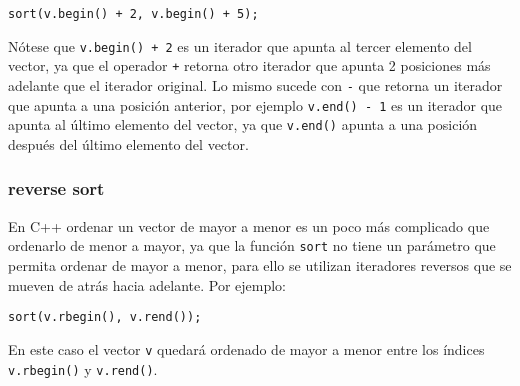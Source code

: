 \begin{lstlisting}
sort(v.begin() + 2, v.begin() + 5);
\end{lstlisting}

Nótese que \texttt{v.begin() + 2} es un iterador que apunta al tercer elemento del vector, ya que el operador \texttt{+}
retorna otro iterador que apunta 2 posiciones más adelante que el iterador original. Lo mismo sucede con \texttt{-} que
retorna un iterador que apunta a una posición anterior, por ejemplo \texttt{v.end() - 1} es un iterador que apunta al
último elemento del vector, ya que \texttt{v.end()} apunta a una posición después del último elemento del vector.


\subsubsection{reverse sort}

En C++ ordenar un vector de mayor a menor es un poco más complicado que ordenarlo de menor a mayor, ya que la función
\texttt{sort} no tiene un parámetro que permita ordenar de mayor a menor, para ello se utilizan iteradores reversos que
se mueven de atrás hacia adelante. Por ejemplo:

\begin{lstlisting}
sort(v.rbegin(), v.rend());
\end{lstlisting}

En este caso el vector \texttt{v} quedará ordenado de mayor a menor entre los índices \texttt{v.rbegin()} y
\texttt{v.rend()}.





